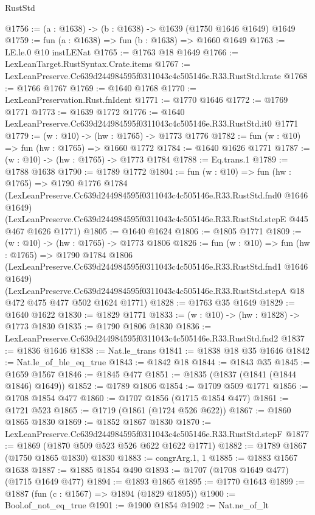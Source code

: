 \begin{lexlean}{RustStd}
\begin{coremodule}
@1756 := (a : @1638) -> (b : @1638) -> @1639 (@1750 @1646 @1649) @1649
@1759 := fun (a : @1638) => fun (b : @1638) => @1660 @1649
@1763 := LE.le.{0} @10 instLENat
@1765 := @1763 @18 @1649
@1766 := LexLeanTarget.RustSyntax.Crate.items
@1767 := LexLeanPreserve.Cc639d244984595f0311043c4c505146e.R33.RustStd.krate
@1768 := @1766 @1767
@1769 := @1640 @1768
@1770 := LexLeanPreservation.Rust.fnIdent
@1771 := @1770 @1646
@1772 := @1769 @1771
@1773 := @1639 @1772
@1776 := @1640 LexLeanPreserve.Cc639d244984595f0311043c4c505146e.R33.RustStd.it0 @1771
@1779 := (w : @10) -> (hw : @1765) -> @1773 @1776
@1782 := fun (w : @10) => fun (hw : @1765) => @1660 @1772
@1784 := @1640 @1626 @1771
@1787 := (w : @10) -> (hw : @1765) -> @1773 @1784
@1788 := Eq.trans.{1}
@1789 := @1788 @1638
@1790 := @1789 @1772
@1804 := fun (w : @10) =>
  fun (hw : @1765) =>
  @1790
    @1776
    @1784
    (LexLeanPreserve.Cc639d244984595f0311043c4c505146e.R33.RustStd.fnd0 @1646 @1649)
    (LexLeanPreserve.Cc639d244984595f0311043c4c505146e.R33.RustStd.stepE @445 @467 @1626 @1771)
@1805 := @1640 @1624
@1806 := @1805 @1771
@1809 := (w : @10) -> (hw : @1765) -> @1773 @1806
@1826 := fun (w : @10) =>
  fun (hw : @1765) =>
  @1790
    @1784
    @1806
    (LexLeanPreserve.Cc639d244984595f0311043c4c505146e.R33.RustStd.fnd1 @1646 @1649)
    (LexLeanPreserve.Cc639d244984595f0311043c4c505146e.R33.RustStd.stepA
      @18
      @472
      @475
      @477
      @502
      @1624
      @1771)
@1828 := @1763 @35 @1649
@1829 := @1640 @1622
@1830 := @1829 @1771
@1833 := (w : @10) -> (hw : @1828) -> @1773 @1830
@1835 := @1790 @1806 @1830
@1836 := LexLeanPreserve.Cc639d244984595f0311043c4c505146e.R33.RustStd.fnd2
@1837 := @1836 @1646
@1838 := Nat.le_trans
@1841 := @1838 @18 @35 @1646
@1842 := Nat.le_of_ble_eq_true
@1843 := @1842 @18
@1844 := @1843 @35
@1845 := @1659 @1567
@1846 := @1845 @477
@1851 := @1835 (@1837 (@1841 (@1844 @1846) @1649))
@1852 := @1789 @1806
@1854 := @1709 @509 @1771
@1856 := @1708 @1854 @477
@1860 := @1707 @1856 (@1715 @1854 @477)
@1861 := @1721 @523
@1865 := @1719 (@1861 (@1724 @526 @622))
@1867 := @1860 @1865 @1830
@1869 := @1852 @1867 @1830
@1870 := LexLeanPreserve.Cc639d244984595f0311043c4c505146e.R33.RustStd.stepF
@1877 := @1869 (@1870 @509 @523 @526 @622 @1622 @1771)
@1882 := @1789 @1867 (@1750 @1865 @1830) @1830
@1883 := congrArg.{1, 1}
@1885 := @1883 @1567 @1638
@1887 := @1885 @1854 @490
@1893 := @1707 (@1708 @1649 @477) (@1715 @1649 @477)
@1894 := @1893 @1865
@1895 := @1770 @1643
@1899 := @1887 (fun (c : @1567) => @1894 (@1829 @1895))
@1900 := Bool.of_not_eq_true
@1901 := @1900 @1854
@1902 := Nat.ne_of_lt

\end{coremodule}
\end{lexlean}
